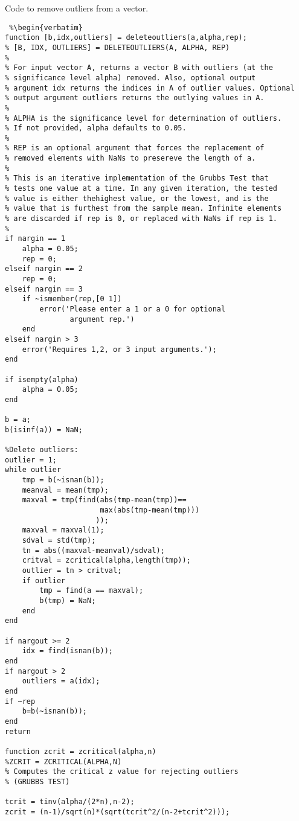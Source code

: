 \clearpage

Code to remove outliers from a vector.

\begin{lstlisting} %\begin{verbatim}
function [b,idx,outliers] = deleteoutliers(a,alpha,rep);
% [B, IDX, OUTLIERS] = DELETEOUTLIERS(A, ALPHA, REP)
%
% For input vector A, returns a vector B with outliers (at the
% significance level alpha) removed. Also, optional output
% argument idx returns the indices in A of outlier values. Optional
% output argument outliers returns the outlying values in A.
%
% ALPHA is the significance level for determination of outliers.
% If not provided, alpha defaults to 0.05.
%
% REP is an optional argument that forces the replacement of
% removed elements with NaNs to presereve the length of a.
%
% This is an iterative implementation of the Grubbs Test that
% tests one value at a time. In any given iteration, the tested
% value is either thehighest value, or the lowest, and is the
% value that is furthest from the sample mean. Infinite elements
% are discarded if rep is 0, or replaced with NaNs if rep is 1.
%
if nargin == 1
	alpha = 0.05;
	rep = 0;
elseif nargin == 2
	rep = 0;
elseif nargin == 3
	if ~ismember(rep,[0 1])
		error('Please enter a 1 or a 0 for optional
		       argument rep.')
	end
elseif nargin > 3
	error('Requires 1,2, or 3 input arguments.');
end

if isempty(alpha)
	alpha = 0.05;
end

b = a;
b(isinf(a)) = NaN;

%Delete outliers:
outlier = 1;
while outlier
	tmp = b(~isnan(b));
	meanval = mean(tmp);
	maxval = tmp(find(abs(tmp-mean(tmp))==
				      max(abs(tmp-mean(tmp)))
				     ));
	maxval = maxval(1);
	sdval = std(tmp);
	tn = abs((maxval-meanval)/sdval);
	critval = zcritical(alpha,length(tmp));
	outlier = tn > critval;
	if outlier
		tmp = find(a == maxval);
		b(tmp) = NaN;
	end
end

if nargout >= 2
	idx = find(isnan(b));
end
if nargout > 2
	outliers = a(idx);
end
if ~rep
	b=b(~isnan(b));
end
return

function zcrit = zcritical(alpha,n)
%ZCRIT = ZCRITICAL(ALPHA,N)
% Computes the critical z value for rejecting outliers
% (GRUBBS TEST)

tcrit = tinv(alpha/(2*n),n-2);
zcrit = (n-1)/sqrt(n)*(sqrt(tcrit^2/(n-2+tcrit^2)));
\end{lstlisting} %
\clearpage

